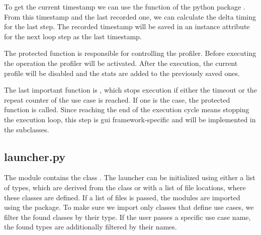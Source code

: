

To get the current timestamp we can use the 
function of the python package . From this timestamp
and the last recorded one, we can calculate the delta timing for the last step.
The recorded timestamp will be saved in an instance attribute for the next loop
step as the last timestamp.



The protected function  is responsible for
controlling the profiler. Before executing the operation the profiler will be
activated. After the execution, the current profile will be disabled and the
stats are added to the previously saved ones.



The last important function is , 
which stops execution if either the timeout or the repeat counter of
the use case is reached. If one is the case, the protected function
 is called. Since reaching the end of the
execution cycle means stopping the execution loop, this step is \gls{gui}
framework-specific and will be implemented in the subclasses. 



\subsection{launcher.py}

The module  contains the class
. The launcher can be initialized using either a
list of types, which are derived from the  class or
with a list of file locations, where these classes are defined. If a list of
files is passed, the modules are imported using the
 package. To make sure we import only classes that
define use cases, we filter the found classes by their type. If the
user passes a specific use case name, the found types are additionally filtered
by their names.



